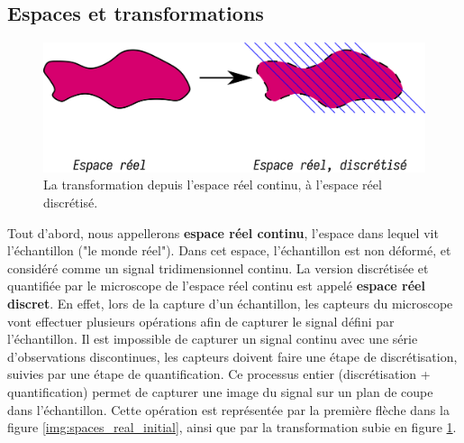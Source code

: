 {{		%

		\subsection{Espaces et transformations}\label{subsection:espaces_transfo}
		{
        

            \begin{figure}[h]
                \centering
                \includegraphics[width=.8\linewidth]{img/spaces_transfo_real2discrete.png}
                \captionsetup{width=.8\linewidth}
                \caption{La transformation depuis l'espace réel continu, à l'espace réel discrétisé.}
                \label{img:spaces_transfo:real_to_discrete}
            \end{figure}

            Tout d'abord, nous appellerons \textbf{espace réel continu}, l'espace dans lequel vit l'échantillon  ("le monde réel"). Dans cet espace, l'échantillon est non déformé, et considéré comme un signal tridimensionnel continu. La version discrétisée et quantifiée par le microscope de l'espace réel continu est appelé \textbf{espace réel discret}. En effet, lors de la capture d'un échantillon, les capteurs du microscope vont effectuer plusieurs opérations afin de capturer le signal défini par l'échantillon. Il est impossible de capturer un signal continu avec une série d'observations discontinues, les capteurs doivent faire une étape de discrétisation, suivies par une étape de quantification. Ce processus entier (discrétisation + quantification) permet de capturer une image du signal sur un plan de coupe dans l'échantillon. Cette opération est représentée par la première flèche dans la figure \ref{img:spaces_real_initial}, ainsi que par la transformation subie en figure \ref{img:spaces_transfo:real_to_discrete}.

}}}
